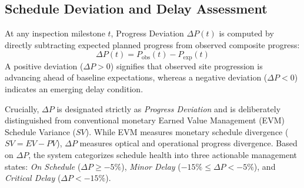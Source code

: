 \documentclass[conference]{IEEEtran}
\begin{document}
\subsection{Schedule Deviation and Delay Assessment}
At any inspection milestone $t$, Progress Deviation $\Delta P(t)$ is computed by directly subtracting expected planned progress from observed composite progress:
\begin{equation}
    \Delta P(t) = P_{\text{obs}}(t) - P_{\text{exp}}(t)
    \label{eq:delta_p}
\end{equation}
A positive deviation ($\Delta P > 0$) signifies that observed site progression is advancing ahead of baseline expectations, whereas a negative deviation ($\Delta P < 0$) indicates an emerging delay condition.

Crucially, $\Delta P$ is designated strictly as \textit{Progress Deviation} and is deliberately distinguished from conventional monetary Earned Value Management (EVM) Schedule Variance ($SV$). While EVM measures monetary schedule divergence ($SV = EV - PV$), $\Delta P$ measures optical and operational progress divergence. Based on $\Delta P$, the system categorizes schedule health into three actionable management states: \textit{On Schedule} ($\Delta P \ge -5\%$), \textit{Minor Delay} ($-15\% \le \Delta P < -5\%$), and \textit{Critical Delay} ($\Delta P < -15\%$).
\end{document}
